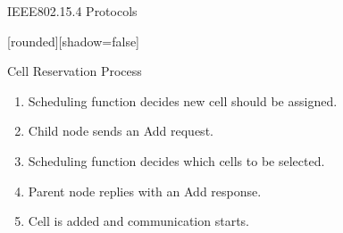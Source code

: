 \begin{withoutheadline}
\begin{frame}{IEEE802.15.4 Protocols}


[rounded][shadow=false]
\begin{block}{Cell Reservation Process}
    \begin{enumerate}
    
    
    \item  Scheduling function decides new cell should be assigned.
    \item<2-> Child node sends an Add request. 
    \item<3-> Scheduling function decides which cells to be selected. 
    \item<4-> Parent node replies with an Add response.
    \item<5-> Cell is added and communication starts.
    \end{enumerate}
    \end{block}

\begin{figure}[p]


\end{figure}
\end{frame}
\end{withoutheadline}
